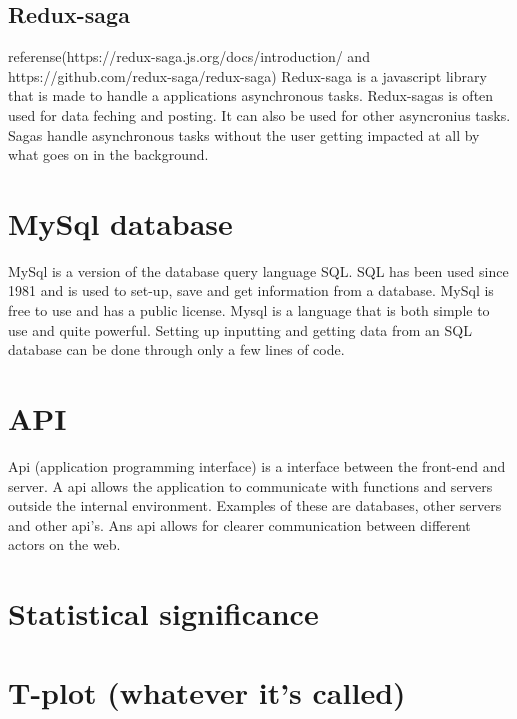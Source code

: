 \subsection{Redux-saga}
referense(https://redux-saga.js.org/docs/introduction/ and https://github.com/redux-saga/redux-saga) Redux-saga is a javascript library that is made to handle a applications asynchronous tasks. Redux-sagas is often used for data feching and posting. It can also be used for other asyncronius tasks. Sagas handle asynchronous tasks without the user getting impacted at all by what goes on in the background.

\section{MySql database}
MySql is a version of the database query language SQL. SQL has been used since 1981 and is used to set-up, save and get information from a database. MySql is free to use and has a public license. Mysql is a language that is both simple to use and quite powerful. Setting up inputting and getting data from an SQL database can be done through only a  few lines of code.

\section{API}
Api (application programming interface) is a interface between the front-end and server. A api allows the application to communicate with functions and servers outside the internal environment. Examples of these are databases, other servers and other api's. Ans api allows for clearer communication between different actors on the web. 

\section{Statistical significance}

\section{T-plot (whatever it's called)}


